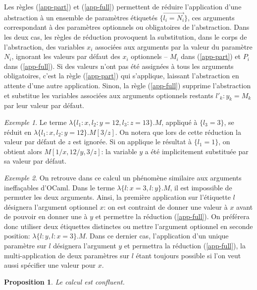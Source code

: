 \documentclass[twoside]{article}
\newcommand{\mabs}[2]{\lambda\{#1\}.#2}
\renewcommand{\vec}[1]{\overrightarrow{#1}}
\theoremstyle{plain}
\newtheorem{proposition}{Proposition}
\theoremstyle{definition}
\theoremstyle{remark}
\newtheorem{exemple}{Exemple}
\begin{document}
Les règles (\ref{app-part}) et (\ref{app-full})
permettent de réduire l'application d'une abstraction à un ensemble
de paramètres étiquetés $\{\vec{l_i=N_i}\}$,
ces arguments correspondant
à des paramètres optionnels ou obligatoires de l'abstraction.
Dans les deux cas, les règles de réduction provoquent la substitution,
dans le corps de l'abstraction,
des variables $x_i$ associées aux arguments par la valeur du paramètre $N_i$,
ignorant les valeurs par défaut des $x_i$ optionnels
-- $M_i$ dans (\ref{app-part}) et $P_i$ dans (\ref{app-full}).
Si des valeurs n'ont pas
été assignées à tous les arguments obligatoires, c'est la règle (\ref{app-part})
qui s'applique, laissant l'abstraction en attente d'une autre application. Sinon,
la règle (\ref{app-full}) supprime l'abstraction et substitue
les variables associées aux arguments optionnels restants $l'_k:y_k=M_k$
par leur valeur par défaut.

\begin{exemple}
  Le terme $\mabs{l_1:x,l_2:y=12,l_3:z=13}{M}$, appliqué à $\{l_3=3\}$, se
  réduit en $\mabs{l_1:x,l_2:y=12}{M[3/z]}$.
  On notera que lors de cette réduction la valeur par défaut de $z$ est ignorée.
  Si on applique le résultat à
  $\{l_1=1\}$, on obtient alors $M[1/x,12/y,3/z]$: la variable $y$
  a été implicitement substituée par sa valeur par défaut.
\end{exemple}

\begin{exemple} \label{ex:ineffacable}
  On retrouve dans ce calcul un phénomène similaire aux arguments ineffaçables
  d'OCaml. Dans le terme $\mabs{l:x=3,l:y}{M}$, il est impossible de permuter
  les deux arguments.
  Ainsi, la première application sur l'étiquette $l$ désignera l'argument
  optionnel $x$: on est contraint de donner une valeur à $x$ avant de pouvoir
  en donner une à $y$ et permettre la réduction (\ref{app-full}).
  On préférera donc utiliser deux étiquettes distinctes
  ou mettre l'argument optionnel en seconde position:
  $\mabs{l:y,l:x=3}{M}$.
  Dans ce dernier cas,
  l'application d'un unique paramètre sur $l$ désignera l'argument $y$
  et permettra la réduction (\ref{app-full}),
  la multi-application de deux paramètres sur $l$ étant toujours possible si
  l'on veut aussi spécifier une valeur pour $x$.
\end{exemple}

\begin{proposition}
  \label{prop:confl}
  Le calcul est confluent.
\end{proposition}
\end{document}
